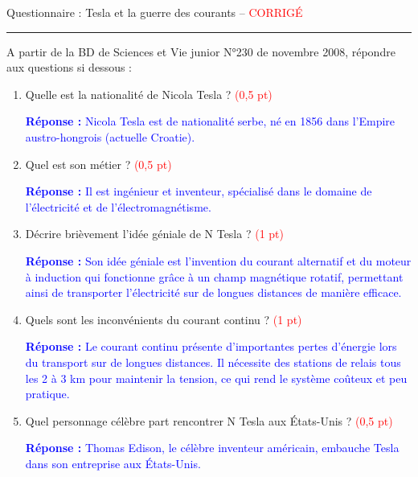 \documentclass[10pt,a4paper]{article}
\begin{document}
\begin{center}
\vspace{-5mm}
\Large{Questionnaire : Tesla et la guerre des courants -- \textcolor{red}{CORRIGÉ}} \\
\vspace{1mm}
\normalsize
\hrule
\end{center}
\vspace{1mm}
{\small A partir de la BD de Sciences et Vie junior N°230 de novembre 2008, répondre aux questions si dessous :}
\vspace{1mm}

\begin{enumerate}[itemsep=1mm]
 
\item Quelle est la nationalité de Nicola Tesla ? \hfill \textcolor{red}{(0,5 pt)}

{\small \textcolor{blue}{\textbf{Réponse :} Nicola Tesla est de nationalité serbe, né en 1856 dans l'Empire austro-hongrois (actuelle Croatie).}}

\item Quel est son métier ? \hfill \textcolor{red}{(0,5 pt)}

{\small \textcolor{blue}{\textbf{Réponse :} Il est ingénieur et inventeur, spécialisé dans le domaine de l'électricité et de l'électromagnétisme.}}

\item Décrire brièvement l'idée géniale de N Tesla ? \hfill \textcolor{red}{(1 pt)}

{\small \textcolor{blue}{\textbf{Réponse :} Son idée géniale est l'invention du courant alternatif et du moteur à induction qui fonctionne grâce à un champ magnétique rotatif, permettant ainsi de transporter l'électricité sur de longues distances de manière efficace.}}

\item Quels sont les inconvénients du courant continu ? \hfill \textcolor{red}{(1 pt)}

{\small \textcolor{blue}{\textbf{Réponse :} Le courant continu présente d'importantes pertes d'énergie lors du transport sur de longues distances. Il nécessite des stations de relais tous les 2 à 3 km pour maintenir la tension, ce qui rend le système coûteux et peu pratique.}}

\item  Quel personnage célèbre part rencontrer N Tesla aux États-Unis ? \hfill \textcolor{red}{(0,5 pt)}

{\small \textcolor{blue}{\textbf{Réponse :} Thomas Edison, le célèbre inventeur américain, embauche Tesla dans son entreprise aux États-Unis.}}


\end{enumerate}
\end{document}
